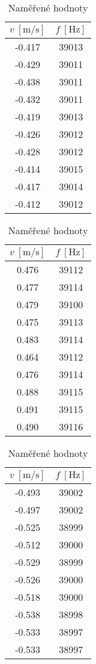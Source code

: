 \documentclass[a4paper,10pt]{article}
\begin{document}
\begin{table}[H]
    \centering
    \begin{minipage}{0.32\textwidth}
     \centering
     \begin{tabular}{|c|c|}
        $v\ [\si{\meter\per\second}]$ & $f\ [\si{\hertz}]$ \\ \hline
        -0.417 & 39013 \\
        -0.429 & 39011 \\
        -0.438 & 39011 \\
        -0.432 & 39011 \\
        -0.419 & 39013 \\
        -0.426 & 39012 \\
        -0.428 & 39012 \\
        -0.414 & 39015 \\
        -0.417 & 39014 \\
        -0.412 & 39012 \\
     \end{tabular}
    \end{minipage}
    \begin{minipage}{0.32\textwidth}
     \centering
     \begin{tabular}{|c|c|}
        $v\ [\si{\meter\per\second}]$ & $f\ [\si{\hertz}]$ \\ \hline
        0.476 & 39112 \\
        0.477 & 39114 \\
        0.479 & 39100 \\
        0.475 & 39113 \\
        0.483 & 39114 \\
        0.464 & 39112 \\
        0.476 & 39114 \\
        0.488 & 39115 \\
        0.491 & 39115 \\
        0.490 & 39116 \\
     \end{tabular}
    \end{minipage}
    \begin{minipage}{0.32\textwidth}
     \centering
     \begin{tabular}{|c|c|}
        $v\ [\si{\meter\per\second}]$ & $f\ [\si{\hertz}]$ \\ \hline
        -0.493 & 39002 \\
        -0.497 & 39002 \\
        -0.525 & 38999 \\
        -0.512 & 39000 \\
        -0.529 & 38999 \\
        -0.526 & 39000 \\
        -0.518 & 39000 \\
        -0.538 & 38998 \\
        -0.533 & 38997 \\
        -0.533 & 38997 \\
     \end{tabular}
    \end{minipage}
    \caption{Naměřené hodnoty}
\end{table}
\end{document}
